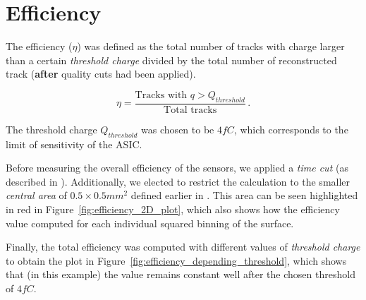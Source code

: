

\section{Efficiency}\label{sec:methods_efficiency}

The efficiency ($\eta$) was defined as the total number of tracks with charge larger than a certain \textit{threshold charge} divided by the total number of reconstructed track (\textbf{after} quality cuts had been applied).


\begin{equation*}
    \eta = \frac{\text{Tracks with } q>Q_{threshold}}{\text{Total tracks}}  \, .
\end{equation*}

The threshold charge $Q_{threshold}$ was chosen to be \(4\si{fC}\), which corresponds to the limit of sensitivity of the ASIC.

Before measuring the overall efficiency of the sensors, we applied a \textit{time cut} (as described in ). Additionally, we elected to restrict the calculation to the smaller \textit{central area} of \(0.5\times0.5\si{mm^2}\) defined earlier in . This area can be seen highlighted in red in Figure~\ref{fig:efficiency_2D_plot}, which also shows how the efficiency value computed for each individual squared binning of the surface.

Finally, the total efficiency was computed with different values of \textit{threshold charge} to obtain the plot in Figure~\ref{fig:efficiency_depending_threshold}, which shows that (in this example) the value remains constant well after the chosen threshold of \(4\si{fC}\).

